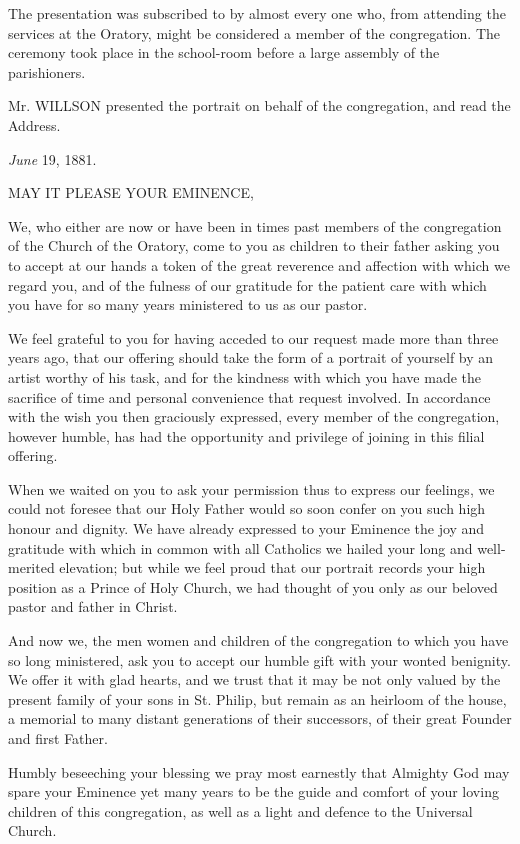 The presentation was subscribed to by almost every one who, from
attending the services at the Oratory, might be considered a member of
the congregation. The ceremony took place in the school-room before a
large assembly of the parishioners.

Mr. WILLSON presented the portrait on behalf of the congregation,
and read the Address.


\emph{June} 19, 1881.

MAY IT PLEASE
YOUR EMINENCE,

We, who either are now or have been in times past members of the
congregation of the Church of the Oratory, come to you as children to
their father asking you to accept at our hands a token of the great
reverence and affection with which we regard you, and of the fulness
of our gratitude for the patient care with which you have for so many years ministered to us as our pastor.

We feel grateful to you for having acceded to our request made more
than three years ago, that our offering should take the form of a
portrait of yourself by an artist worthy of his task, and for the
kindness with which you have made the sacrifice of time and personal
convenience that request involved. In accordance with the wish you
then graciously expressed, every member of the congregation, however
humble, has had the opportunity and privilege of joining in this
filial offering.

When we waited on you to ask your permission thus to express our
feelings, we could not foresee that our Holy Father would so soon
confer on you such high honour and dignity. We have already expressed
to your Eminence the joy and gratitude with which in common with all
Catholics we hailed your long and well-merited elevation; but while we
feel proud that our portrait records your high position as a Prince of
Holy Church, we had thought of you only as our beloved pastor and
father in Christ.

And now we, the men women and children of the congregation to which
you have so long ministered, ask you to accept our humble gift with
your wonted benignity. We offer it with glad hearts, and we trust that
it may be not only valued by the present family of your sons in
St. Philip, but remain as an heirloom of the house, a memorial to many
distant generations of their successors, of their great Founder and
first Father.

Humbly beseeching your blessing we pray most earnestly that
Almighty God may spare your Eminence yet many years to be the guide
and comfort of your loving children of this congregation, as well as a
light and defence to the Universal Church.

